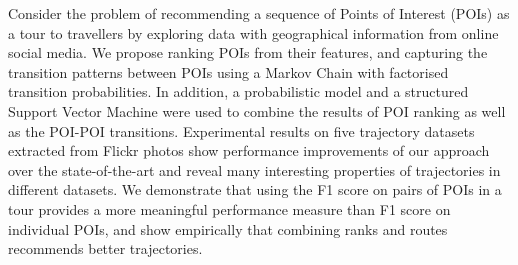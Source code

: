 Consider the problem of recommending a sequence of Points of Interest (POIs) as a tour
to travellers by exploring data with geographical information from online social media.
We propose ranking POIs from their features, and capturing the transition patterns between POIs
using a Markov Chain with factorised transition probabilities.
In addition, a probabilistic model and a structured Support Vector Machine were used
to combine the results of POI ranking as well as the POI-POI transitions.
Experimental results on five trajectory datasets extracted from Flickr photos show performance
improvements of our approach over the state-of-the-art and reveal many interesting properties
of trajectories in different datasets.
We demonstrate that using the F1 score on pairs of POIs in a tour provides a more
meaningful performance measure than F1 score on individual POIs, and show empirically that
combining ranks and routes recommends better trajectories.
